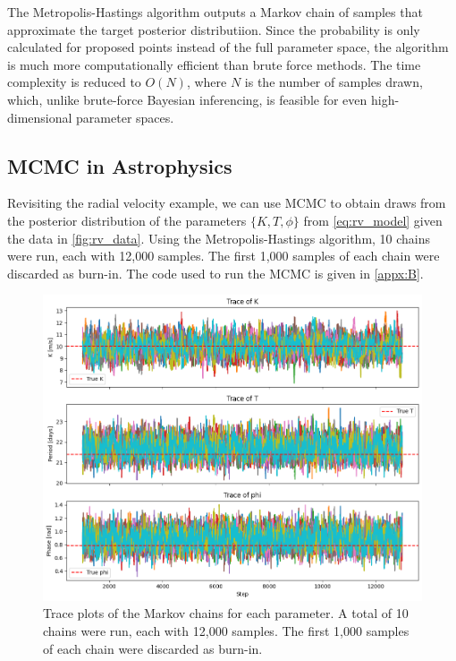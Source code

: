 \documentclass[preprint,longauthor]{aastex631}
\numberwithin{equation}{section}
\begin{document}
The Metropolis-Hastings algorithm outputs a Markov chain of samples that approximate the target posterior distributiion. Since the probability is only calculated for proposed points instead of the full parameter space, the algorithm is much more computationally efficient than brute force methods. The time complexity is reduced to $O(N)$, where $N$ is the number of samples drawn, which, unlike brute-force Bayesian inferencing, is feasible for even high-dimensional parameter spaces.

\subsection{MCMC in Astrophysics}

Revisiting the radial velocity example, we can use MCMC to obtain draws from the posterior distribution of the parameters $\{K,T,\phi\}$ from \autoref{eq:rv_model} given the data in \autoref{fig:rv_data}. Using the Metropolis-Hastings algorithm, 10 chains were run, each with 12,000 samples. The first 1,000 samples of each chain were discarded as burn-in. The code used to run the MCMC is given in \autoref{appx:B}.

\begin{figure}[ht!]
\centering
\includegraphics[width=\textwidth]{../scripts/2.5/figures/traces.png}
\caption{Trace plots of the Markov chains for each parameter. A total of 10 chains were run, each with 12,000 samples. The first 1,000 samples of each chain were discarded as burn-in.}
\label{fig:mcmc_trace}
\end{figure}
\end{document}
